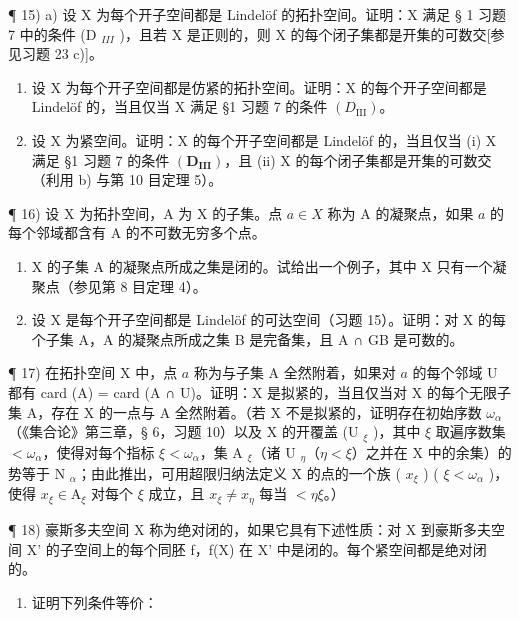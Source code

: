 ¶ 15) a) 设 X 为每个开子空间都是 Lindelöf 的拓扑空间。证明：X 满足 § 1 习题 7 中的条件 (D \(_{III}\) )，且若 X 是正则的，则 X 的每个闭子集都是开集的可数交{[}参见习题 23 c){]}。

\begin{enumerate}
\def\labelenumi{\alph{enumi})}
\setcounter{enumi}{1}
\item
  设 X 为每个开子空间都是仿紧的拓扑空间。证明：X 的每个开子空间都是 Lindelöf 的，当且仅当 X 满足 §1 习题 7 的条件 \((D_{\mathrm{III}})\)。
\item
  设 X 为紧空间。证明：X 的每个开子空间都是 Lindelöf 的，当且仅当 (i) X 满足 §1 习题 7 的条件 \((\mathbf{D}_{\mathbf{III}})\)，且 (ii) X 的每个闭子集都是开集的可数交（利用 b) 与第 10 目定理 5）。
\end{enumerate}

¶ 16) 设 X 为拓扑空间，A 为 X 的子集。点 \(a \in X\) 称为 A 的凝聚点，如果 \(a\) 的每个邻域都含有 A 的不可数无穷多个点。

\begin{enumerate}
\def\labelenumi{\alph{enumi})}
\item
  X 的子集 A 的凝聚点所成之集是闭的。试给出一个例子，其中 X 只有一个凝聚点（参见第 8 目定理 4）。
\item
  设 X 是每个开子空间都是 Lindelöf 的可达空间（习题 15）。证明：对 X 的每个子集 A，A 的凝聚点所成之集 B 是完备集，且 A ∩ GB 是可数的。
\end{enumerate}

¶ 17) 在拓扑空间 X 中，点 \(a\) 称为与子集 A 全然附着，如果对 \(a\) 的每个邻域 U 都有 card (A) = card (A ∩ U)。证明：X 是拟紧的，当且仅当对 X 的每个无限子集 A，存在 X 的一点与 A 全然附着。（若 X 不是拟紧的，证明存在初始序数 \(\omega_{\alpha}\)（《集合论》第三章，§ 6，习题 10）以及 X 的开覆盖 (U \(_{\xi}\) )，其中 \(\xi\) 取遍序数集 \(<\omega_{\alpha}\)，使得对每个指标 \(\xi<\omega_{\alpha}\)，集 A \(_{\xi}\)（诸 U \(_{\eta}\)（\(\eta<\xi\)）之并在 X 中的余集）的势等于 N \(_{\alpha}\)；由此推出，可用超限归纳法定义 X 的点的一个族 ( \(x_{\xi}\) ) ( \(\xi<\omega_{\alpha}\) )，使得 \(x_{\xi}\in\mathrm{A}_{\xi}\) 对每个 \(\xi\) 成立，且 \(x_{\xi}\neq x_{\eta}\) 每当 \(<\eta\xi\)。）

¶ 18) 豪斯多夫空间 X 称为绝对闭的，如果它具有下述性质：对 X 到豪斯多夫空间 X' 的子空间上的每个同胚 f，f(X) 在 X' 中是闭的。每个紧空间都是绝对闭的。

\begin{enumerate}
\def\labelenumi{\alph{enumi})}
\tightlist
\item
  证明下列条件等价：
\end{enumerate}

